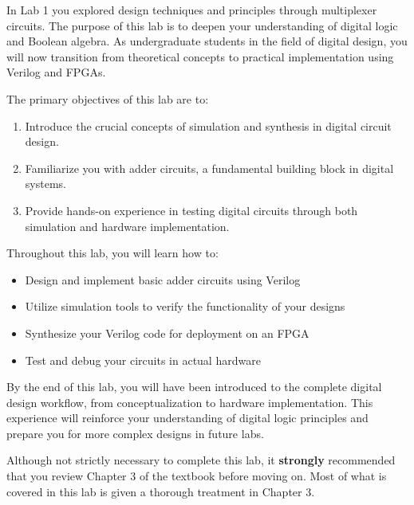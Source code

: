 \documentclass[12pt]{labmanual}
\begin{document}
In Lab 1 you explored design techniques and principles through multiplexer circuits. The purpose of this lab is to deepen your understanding of digital logic and Boolean algebra. As undergraduate students in the field of digital design, you will now transition from theoretical concepts to practical implementation using Verilog and FPGAs.

The primary objectives of this lab are to:
\begin{enumerate}
    \item Introduce the crucial concepts of simulation and synthesis in digital circuit design.
    \item Familiarize you with adder circuits, a fundamental building block in digital systems.
    \item Provide hands-on experience in testing digital circuits through both simulation and hardware implementation.
\end{enumerate}



Throughout this lab, you will learn how to:

\begin{itemize}
\item Design and implement basic adder circuits using Verilog
\item Utilize simulation tools to verify the functionality of your designs
\item Synthesize your Verilog code for deployment on an FPGA
\item Test and debug your circuits in actual hardware
\end{itemize}

By the end of this lab, you will have been introduced to the complete digital design workflow, from conceptualization to hardware implementation. This experience will reinforce your understanding of digital logic principles and prepare you for more complex designs in future labs.

\begin{extra}
    Although not strictly necessary to complete this lab, it \textbf{strongly} recommended that you review Chapter 3 of the textbook before moving on. Most of what is covered in this lab is given a thorough treatment in Chapter 3.
\end{extra}
\end{document}
